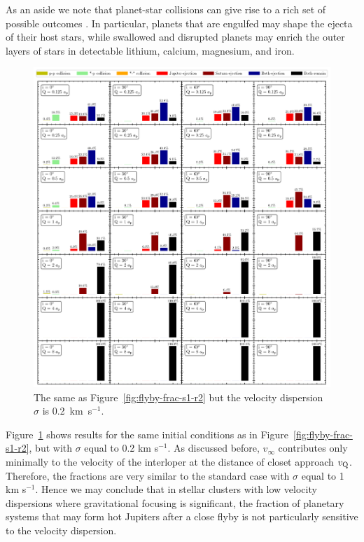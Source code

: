 \documentclass[twocolumn]{aastex63}
\newcommand*\fgr[1]{Figure~\ref{#1}}
\begin{document}
As an aside we note that planet-star collisions can give rise to a rich set of possible outcomes \citep{schuler2011,demarco2011,
kratter2012,ginsburg2012,veras2013,deal2015}. In particular, planets that are engulfed may shape the ejecta of their host stars, while swallowed and disrupted planets may enrich the outer layers of stars in detectable lithium, calcium, magnesium, and iron.  

\begin{figure}
    \includegraphics[width=\textwidth]{figs/flyby-frac-s02-r2.pdf}
    \caption{The same as \fgr{fig:flyby-frac-s1-r2} but the velocity dispersion $\sigma$ is 0.2~km~s$^{-1}$.}
    \label{fig:flyby-frac-s02-r2}
\end{figure}
\fgr{fig:flyby-frac-s02-r2} shows results for the same initial conditions as in \fgr{fig:flyby-frac-s1-r2}, but with $\sigma$ equal to 0.2 km s$^{-1}$. As discussed before, $v_\infty$  contributes only minimally to the velocity of the interloper at the distance of closet approach $v_{\rm Q}$. Therefore, the fractions are very similar to the standard case with $\sigma$ equal to 1 km s$^{-1}$. Hence we may conclude that in stellar clusters with low velocity dispersions where gravitational focusing is significant, the fraction of planetary systems that may form hot Jupiters after a close flyby is not particularly sensitive to the velocity dispersion.
\end{document}
